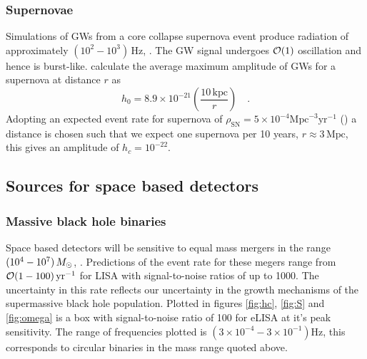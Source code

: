 \subsubsection{Supernovae}
Simulations of GWs from a core collapse supernova event produce radiation of approximately $(10^{2}-10^{3})\,\textrm{Hz}$, \cite{2002A&A...393..523D}. The GW signal undergoes ${\cal{O}}(1)$ oscillation and hence is burst-like. \cite{2002A&A...393..523D} calculate the average maximum amplitude of GWs for a supernova at distance $r$ as
\begin{equation} h_{0}=8.9\times 10^{-21}\left( \frac{10 \,\textrm{kpc}}{r} \right) \quad .\end{equation}
Adopting an expected event rate for supernova of $\rho_{\textrm{SN}}=5\times10^{-4}\textrm{Mpc}^{-3}\textrm{yr}^{-1}$ (\cite{2013ASPC..467...59S}) a distance is chosen such that we expect one supernova per 10 years, $r\approx 3 \,\textrm{Mpc}$, this gives an amplitude of $h_{c}=10^{-22}$.




\subsection{Sources for space based detectors}

\subsubsection{Massive black hole binaries}
Space based detectors will be sensitive to equal mass mergers in the range $(10^{4}-10^{7})\,M_{ \odot }$, \cite{JohnsLivingReview}. Predictions of the event rate for these megers range from ${\cal{O}}(1-100)\,\textrm{yr}^{-1}$ for LISA with signal-to-noise ratios of up to 1000. The uncertainty in this rate reflects our uncertainty in the growth mechanisms of the supermassive black hole population. Plotted in figures \ref{fig:hc}, \ref{fig:S} and \ref{fig:omega} is a box with signal-to-noise ratio of 100 for eLISA at it's peak sensitivity. The range of frequencies plotted is $(3\times 10^{-4}-3\times 10^{-1})\textrm{Hz}$, this corresponds to circular binaries in the mass range quoted above.

